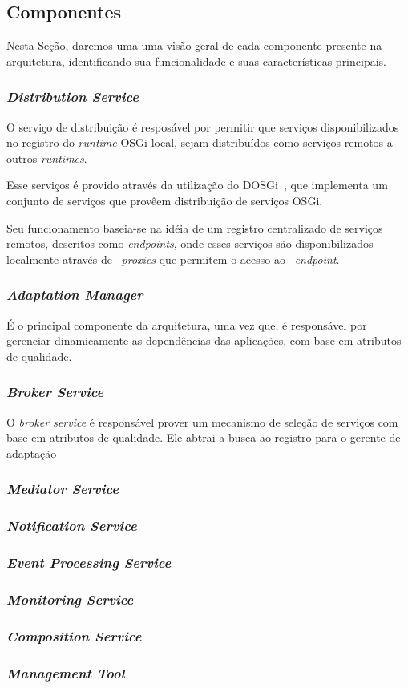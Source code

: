 \subsection{Componentes}
Nesta Seção, daremos uma uma visão geral de cada componente presente na arquitetura, identificando sua funcionalidade e suas características principais.

\subsubsection{\textit{Distribution Service}}
O serviço de distribuição é resposável por permitir que serviços disponibilizados no registro do \textit{runtime} OSGi local, sejam distribuídos como serviços remotos a outros \textit{runtimes}.

Esse serviços é provido através da utilização do DOSGi~\cite{dosgi}, que implementa um conjunto de serviços que provêem distribuição de serviços OSGi. 

Seu funcionamento baseia-se na idéia de um registro centralizado de serviços remotos, descritos como \textit{endpoints}, onde esses serviços são disponibilizados localmente através de ~\textit{proxies} que permitem o acesso ao ~\textit{endpoint}.

\subsubsection{\textit{Adaptation Manager}}
É o principal componente da arquitetura, uma vez que, é responsável por gerenciar dinamicamente as dependências das aplicações, com base em atributos de qualidade.

\subsubsection{\textit{Broker Service}}
O \textit{broker service} é responsável prover um mecanismo de seleção de serviços com base em atributos de qualidade. Ele abtrai a busca ao registro para o gerente de adaptação


\subsubsection{\textit{Mediator Service}}

\subsubsection{\textit{Notification Service}}

\subsubsection{\textit{Event Processing Service}}
\label{subsec:cep}

\subsubsection{\textit{Monitoring Service}}
\label{subsec:monit_serv}

\subsubsection{\textit{Composition Service}}

\subsubsection{\textit{Management Tool}}

